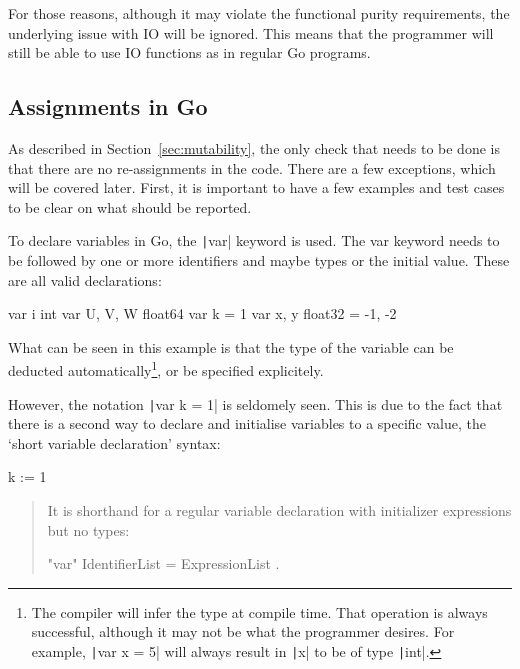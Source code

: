 For those reasons, although it may violate the functional purity requirements,
the underlying issue with IO will be ignored. This means that the programmer
will still be able to use IO functions as in regular Go programs.

\subsection{Assignments in Go}

As described in Section~\ref{sec:mutability}, the only check that needs
to be done is that there are no re-assignments in the code. There are a few
exceptions, which will be covered later. First, it is important to have
a few examples and test cases to be clear on what should be reported.

To declare variables in Go, the \texttt|var| keyword is used.
The var keyword needs to be followed by one or more identifiers and maybe
types or the initial value. These are all valid declarations:

\begin{code}
	\begin{gocode}
var i int
var U, V, W float64
var k = 1
var x, y float32 = -1, -2
	\end{gocode}
\end{code}
What can be seen in this example is that the type of the variable can be
deducted automatically\footnote{The compiler will infer the type at compile
time. That operation is always successful, although it may not be what
the programmer desires. For example, \texttt|var x = 5| will
always result in \texttt|x| to be of type \texttt|int|.},
or be specified explicitely.

However, the notation \texttt|var k = 1| is seldomely seen. This
is due to the fact that there is a second way to declare and initialise
variables to a specific value, the `short variable declaration' syntax:

\begin{gocode}
	k := 1
\end{gocode}
\begin{quote}
It is shorthand for a regular variable declaration with initializer expressions but no types:

\begin{bnfcode}
"var" IdentifierList = ExpressionList .
\end{bnfcode}
\autocite{short-hand-decl}
\end{quote}

